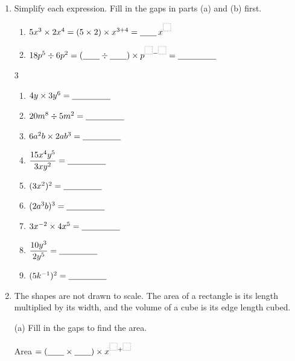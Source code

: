\documentclass[12pt,a4paper]{article}
\newcommand{\ansline}[1][2.2cm]{\underline{\hspace{#1}}}
\newcommand{\gap}{\underline{\hspace{0.7cm}}}
\newcommand{\boxgap}[1][9pt]{\tikz[baseline=-0.8pt]\draw[gray!60,densely dotted,thick]
  (0,0) rectangle (#1,#1);}
\begin{document}
\begin{enumerate}[resume]

\item Simplify each expression. Fill in the gaps in parts (a) and (b) first.
\begin{enumerate}
  \item $5x^3\times2x^4=(5\times2)\times x^{3+4}=\gap\,x^{\boxgap}$
  \item $18p^5\div6p^2=(\gap\div\gap)\times p^{\boxgap-\boxgap}=\ansline[1.6cm]$
\end{enumerate}
\begin{multicols}{3}
\begin{enumerate}[resume,itemsep=12pt]
  \item $4y\times3y^6=\ansline[1.6cm]$
  \item $20m^8\div5m^2=\ansline[1.6cm]$
  \item $6a^2b\times2ab^3=\ansline[1.6cm]$
  \item $\dfrac{15x^4y^5}{3xy^2}=\ansline[1.6cm]$
  \item $(3x^2)^2=\ansline[1.6cm]$
  \item $(2a^3b)^3=\ansline[1.6cm]$
  \item $3x^{-2}\times4x^5=\ansline[1.6cm]$
  \item $\dfrac{10y^3}{2y^5}=\ansline[1.6cm]$
  \item $(5k^{-1})^2=\ansline[1.6cm]$
\end{enumerate}
\end{multicols}

\item The shapes are not drawn to scale. The area of a rectangle is its length
multiplied by its width, and the volume of a cube is its edge length cubed.
\vspace{2pt}

\begin{minipage}[t]{0.32\linewidth}
\raggedright
(a) Fill in the gaps to find the area.

\vspace{4pt}
\centering
{}

\vspace{6pt}
\raggedright
Area $=(\gap\times\gap)\times x^{\boxgap+\boxgap}$


\end{minipage}
\end{enumerate}
\end{document}
